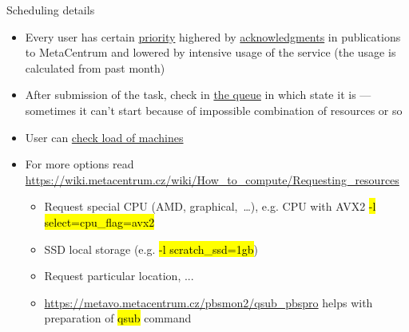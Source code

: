 \documentclass[compress, ucs, xelatex, 11pt, xcolor=svgnames,
  hyperref={
    bookmarks=true,
    unicode=true,
    colorlinks=true,
    pdftitle={Linux, command line and MetaCentrum},
    plainpages=false,
    pdfauthor={Vojtech Zeisek},
    pdfsubject={Course about use of Linux command line, writing shell scripts and using MetaCentrum of CESNET},
    pdfcreator={XeLaTeX},
    pdfkeywords={Linux, GNU, BASH, shell, command line, MetaCentrum},
    linkcolor=DarkRed,
    anchorcolor=DarkBlue,
    citecolor=Indigo,
    filecolor=NavyBlue,
    menucolor=DarkMagenta,
    urlcolor=DarkBlue,
    pdftex},
  url={hyphens, lowtilde} %
  ]{beamer}
\renewcommand{\texttt}[1]{\hl{\ttfamily #1}}
\begin{document}
\begin{frame}[allowframebreaks]{Scheduling details}
\begin{itemize}
    \item Every user has certain \href{https://metavo.metacentrum.cz/pbsmon2/users/}{priority} highered by \href{https://wiki.metacentrum.cz/wiki/Usage_rules/Acknowledgement}{acknowledgments} in publications to MetaCentrum and lowered by intensive usage of the service (the usage is calculated from past month)
    \item After submission of the task, check in \href{https://metavo.metacentrum.cz/pbsmon2/queues/jobsQueued}{the queue} in which state it is --- sometimes it can't start because of impossible combination of resources or so
    \item User can \href{https://metavo.metacentrum.cz/pbsmon2/nodes/physical}{check load of machines}
    \item For more options read \url{https://wiki.metacentrum.cz/wiki/How_to_compute/Requesting_resources}
    \begin{itemize}
      \item Request special CPU (AMD, graphical,~\ldots), e.g. CPU with AVX2 \texttt{-l select=cpu\_flag=avx2}
      \item SSD local storage (e.g. \texttt{-l scratch\_ssd=1gb})
      \item Request particular location, ...
      \item \url{https://metavo.metacentrum.cz/pbsmon2/qsub_pbspro} helps with preparation of \texttt{qsub} command
    \end{itemize}
  \end{itemize}
\end{frame}
\end{document}
